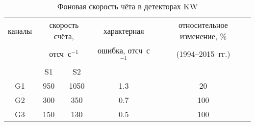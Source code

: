 \begin{table} [h]
 \centering
 \caption{Фоновая скорость чёта в детекторах KW}
 \label{tab:bg_cnt_rate}
\scriptsize
  \begin{center}
  \begin{tabular}{c c c c c}
  \hline
  \hline
каналы & \multicolumn{2}{c}{скорость счёта,} & характерная        & относительное изменение, \% \\
  & \multicolumn{2}{c}{отсч~с$^{-1}$} &   ошибка, отсч~с$^{-1}$   & (1994--2015~гг.)\\
       &  S1        &    S2      &                        &         \\       
\hline
G1 &   950  & 1050  & 1.3 & 20 \\ 
G2 &   300  & 350   & 0.7 & 100 \\ 
G3 &   150  & 130   & 0.5 & 100 \\ 
\hline
\end{tabular}
\end{center}
\end{table}